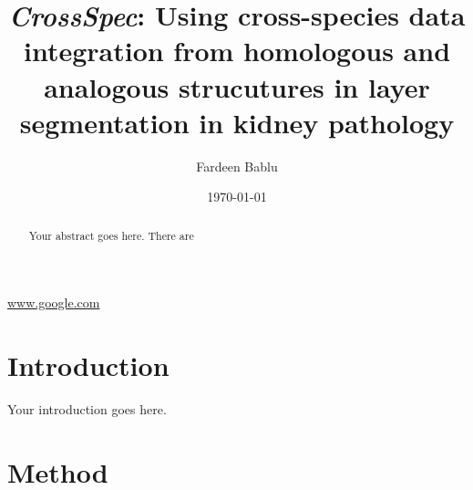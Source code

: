 \documentclass{article}
\title{\textit{CrossSpec}: Using cross-species data integration from homologous and analogous strucutures in layer segmentation in kidney pathology}
\author{Fardeen Bablu}
\date{\today}
\begin{document}
\maketitle

\begin{abstract}
Your abstract goes here. There are 
\end{abstract} \url{www.google.com}

\section{Introduction}
Your introduction goes here.

\section{Method}
\end{document}
